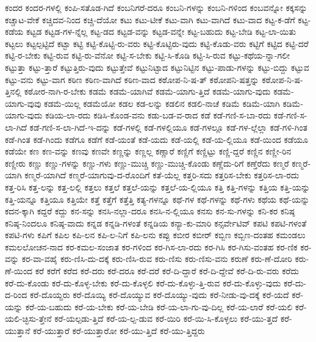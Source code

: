 {ಕಂದರ
ಕಂದರ-ಗಳಲ್ಲಿ
ಕಂಪಿ-ಸತೊಡ-ಗಿದೆ
ಕಂಬನಿಗರೆ-ದರೂ
ಕಂಬನಿ-ಗಳನ್ನು
ಕಂಬನಿ-ಗಳಿಂದ
ಕಂಬವನ್ನೋ
ಕಕ್ಕಸನ್ನು
ಕಚ್ಚಾಟ-ವೇಕೆ
ಕಚ್ಚಿದವ-ನಿಂದ
ಕಚ್ಚಿ-ದೆಯೋ
ಕಟು
ಕಟು-ಟೀಕೆ
ಕಟು-ವಾಗಿ
ಕಟು-ವಾಗಿದೆ
ಕಟು-ವಾದ
ಕಟ್ಟ-ಕ-ಡೆಗೆ
ಕಟ್ಟ-ಕಡೆಯ
ಕಟ್ಟಡ
ಕಟ್ಟಡ-ಗಳ-ನ್ನೆಲ್ಲ
ಕಟ್ಟ-ಡದ
ಕಟ್ಟಡ-ವನ್ನು
ಕಟ್ಟಡ-ವನ್ನೇ
ಕಟ್ಟ-ಬಹುದು
ಕಟ್ಟ-ಬೇಡಿ
ಕಟ್ಟ-ಲಾ-ಯಿತು
ಕಟ್ಟಲು
ಕಟ್ಟಲ್ಪಟ್ಟಿದೆ
ಕಟ್ಟಾ
ಕಟ್ಟಿ
ಕಟ್ಟಿ-ಕೊಟ್ಟಿ-ರು-ವರು
ಕಟ್ಟಿ-ಕೊಟ್ಟಿರು-ವುದು
ಕಟ್ಟಿ-ಕೊಡು-ವರು
ಕಟ್ಟಿಗೆ
ಕಟ್ಟಿದ
ಕಟ್ಟಿ-ದರೆ
ಕಟ್ಟಿ-ರ-ಬೇಕು
ಕಟ್ಟಿ-ರುವ
ಕಟ್ಟಿ-ರು-ವೆನೋ
ಕಟ್ಟಿ-ಸ-ಬೇಕು
ಕಟ್ಟಿ-ಸಿ-ಕೊಡಿ
ಕಟ್ಟಿ-ಸಿ-ರುವ
ಕಟ್ಟು-ಕಥೆಯ-ನ್ನಾ-ಗಲೀ
ಕಟ್ಟುತ್ತಾ
ಕಟ್ಟು-ತ್ತಾರೆ
ಕಟ್ಟುತ್ತಿರು-ವುದು
ಕಟ್ಟುತ್ತೇವೆ
ಕಟ್ಟುನಿಟ್ಟಾದ
ಕಟ್ಟುನಿಟ್ಟಿನ
ಕಟ್ಟು-ಪಾಡು-ಗಳನ್ನು
ಕಟ್ಟು-ಬಿದ್ದು
ಕಟ್ಟುವ
ಕಟ್ಟು-ವನು
ಕಟ್ಟು-ವಾಗ
ಕಠಿಣ
ಕಠಿಣ-ವಾಗಿದೆ
ಕಠಿಣ-ವಾದ
ಕಠೋಪ-ನಿ-ಷ-ತ್
ಕಠೋಪನಿ-ಷತ್ತನ್ನು
ಕಠೋಪ-ನಿ-ಷ-ತ್ತಿನಲ್ಲಿ
ಕಠೋರ-ನಾಗಿ-ರ-ಬೇಕು
ಕಡಮೆ
ಕಡಮೆ-ಯಾಗಿವೆ
ಕಡಮೆ-ಯಾಗು-ತ್ತಿದೆ
ಕಡಮೆ-ಯಾಗು-ವುದು
ಕಡಮೆ-ಯಾಗು-ವುವು
ಕಡಮೆ-ಯಿಲ್ಲ
ಕಡಮೆಯೋ
ಕಡಲ
ಕಡ-ಲನ್ನು
ಕಡಲಿನ
ಕಡಲಿ-ನಾಚೆ
ಕಡಿಮೆ
ಕಡಿಮೆ-ಯಾಗಿ
ಕಡಿಮೆ-ಯಾಗು-ವುದು
ಕಡಿಯ-ಲಾ-ರದು
ಕಡಿಸಿ-ಕೊಂಡ-ವನು
ಕಡು-ಬಡ-ವ-ರಾದ
ಕಡೆ
ಕಡೆ-ಗಣಿ-ಸ-ಬಾ-ರದು
ಕಡೆ-ಗಣಿ-ಸ-ಲಾ-ಗಿದೆ
ಕಡೆ-ಗಣಿ-ಸ-ಲಾ-ಗಿದೆ-ಇ-ದನ್ನು
ಕಡೆ-ಗಳಲ್ಲಿ
ಕಡೆ-ಗಳಲ್ಲಿಯೂ
ಕಡೆ-ಗಳಲ್ಲೂ
ಕಡೆ-ಗಳ-ಲ್ಲೆಲ್ಲಾ
ಕಡೆ-ಗಳಿ-ಗಿಂತ
ಕಡೆ-ಗಿಂತ
ಕಡೆ-ಗಿಂದು
ಕಡೆಗೂ
ಕಡೆಗೆ
ಕಡೆ-ಯಂತೆ
ಕಡೆ-ಯದು
ಕಡೆ-ಯಲ್ಲಿ
ಕಡೆ-ಯ-ಲ್ಲಿಯೂ
ಕಡೆ-ಯಿಂದ
ಕಡೆಯೂ
ಕಡೆಯೇ
ಕಣ
ಕಣ-ವನ್ನು
ಕಣವು
ಕಣವೇ
ಕಣ್ಣನ್ನು
ಕಣ್ಣಲ್ಲ
ಕಣ್ಣಾರೆ
ಕಣ್ಣಿಗೆ
ಕಣ್ಣಿಟ್ಟು
ಕಣ್ಣಿ-ದ್ದರೆ
ಕಣ್ಣಿನ
ಕಣ್ಣೀ-ರಿನ
ಕಣ್ಣೀರು
ಕಣ್ಣು
ಕಣ್ಣು-ಗಳನ್ನು
ಕಣ್ಣು-ಗಳು
ಕಣ್ಣು-ಮುಚ್ಚಿ
ಕಣ್ಣು-ಮುಚ್ಚಿ-ಕೊಂಡು
ಕಣ್ಣೆದು-ರಿಗೆ
ಕಣ್ತೆರೆದು
ಕಣ್ಮರೆ
ಕಣ್ಮರೆ-ಯಾಗಿ
ಕಣ್ಮರೆ-ಯಾಗಿದೆ
ಕಣ್ಮರೆ-ಯಾಗುವು-ದ-ರೊಂದಿಗೆ
ಕತೆ-ಯೆಲ್ಲ
ಕತ್ತರಿ-ಸದು
ಕತ್ತರಿಸ-ಬೇಕು
ಕತ್ತರಿಸ-ಲಾ-ರದು
ಕತ್ತ-ರಿಸಿ
ಕತ್ತ-ಲನ್ನು
ಕತ್ತ-ಲಲ್ಲಿ
ಕತ್ತಲು
ಕತ್ತಲೆ
ಕತ್ತಲೆ-ಯನ್ನು
ಕತ್ತಲೆ-ಯ-ಲ್ಲಿಯೂ
ಕತ್ತಿ
ಕತ್ತಿ-ಗಳನ್ನು
ಕತ್ತಿಯ
ಕತ್ತಿ-ಯನ್ನು
ಕತ್ತಿ-ಯನ್ನೂ
ಕತ್ತಿಯೂ
ಕತ್ತಿಯೇ
ಕತ್ತೆ
ಕತ್ತೆಗೆ
ಕತ್ತೆತ್ತಿ
ಕತ್ಯ-ಗಳನ್ನೂ
ಕಥೆ-ಗಳ
ಕಥೆ-ಗಳನ್ನು
ಕಥೆ-ಗಳು
ಕಥೆಯ
ಕಥೆ-ಯನ್ನು
ಕದನ-ಕ್ಕಾಗಿ
ಕದ್ದರೆ
ಕದ್ದು
ಕನ-ಸನ್ನು
ಕನಸಿ-ನಲ್ಲಾ-ದರೂ
ಕನಸಿ-ನ-ಲ್ಲಿಯೂ
ಕನಸು
ಕನ-ಸು-ಗಳನ್ನು
ಕನಿ-ಕರ
ಕನಿಷ್ಠ
ಕನಿಷ್ಠ-ನಿಂದಲೂ
ಕನಿಷ್ಠ-ವಾದು
ಕನ್ನಡ
ಕನ್ನಡಿ-ಗಳಂತೆ
ಕನ್ನಡಿಯ
ಕನ್ಯಾ-ಕು-ಮಾರಿ
ಕನ್ಸರ್ವೇಟಿವ್
ಕಪಟಿ
ಕಪಟಿ-ಗಳಂತೆ
ಕಪಟಿ-ಗಳು
ಕಪಿಗೆ
ಕಪಿಲ
ಕಪಿ-ಲನ
ಕಪಿ-ಲ-ನಿಗೆ
ಕಪಿ-ಲನು
ಕಪ್ಪು
ಕಬೀರ
ಕಬೀರ್
ಕಬ್ಬಿಣ
ಕಬ್ಬಿಣ-ದಂತಹ
ಕಮಂಡಲು
ಕಮಲಲೋಚನ-ನಾದ
ಕರ-ಕಮಲ-ಸಂಜಾತ
ಕರ-ಗಳಿಂದ
ಕರ-ಗಿಸ-ಲಾ-ರದು
ಕರ-ಗಿಸಿ
ಕರ-ಗಿಸು-ವಂತಹ
ಕರ-ಣಿಕ
ಕರ-ವನ್ನು
ಕರ-ವಾ-ವಹೈ
ಕರು-ಣಿಸಿ-ದು-ದಕ್ಕೆ
ಕರು-ಣಿಸಿ-ರುವ
ಕರು-ಣಿಸು
ಕರು-ಣಿಸು-ವನು
ಕರುಣೆ
ಕರು-ಣೆ-ದೋರಿ
ಕರು-ಣೆ-ಯಿಂದ
ಕರೆ
ಕರೆಗೆ
ಕರೆದ
ಕರೆ-ದರು
ಕರೆ-ದರೂ
ಕರೆ-ದರೆ
ಕರೆ-ದಿ-ದ್ದಾರೆ
ಕರೆ-ದಿ-ದ್ದೇವೆ
ಕರೆ-ದಿ-ರು-ವರು
ಕರೆದು
ಕರೆ-ದು-ಕೊಂಡು
ಕರೆ-ದು-ಕೊಳ್ಳ-ಬೇಕು
ಕರೆ-ದು-ಕೊಳ್ಳಲಿ
ಕರೆ-ದು-ಕೊಳ್ಳು-ತ್ತಿ-ರುವ
ಕರೆ-ದು-ಕೊಳ್ಳು-ವುದು
ಕರೆ-ದು-ದ-ರಿಂದ
ಕರೆ-ದೊಯ್ದರು
ಕರೆ-ದೊಯ್ಯಿ
ಕರೆ-ದೊಯ್ಯುವ
ಕರೆ-ದೊಯ್ಯು-ವುದು
ಕರೆ-ನೀಡು-ವು-ದಕ್ಕೆ
ಕರೆ-ಯದೆ
ಕರೆ-ಯನ್ನು
ಕರೆ-ಯ-ಬಹುದು
ಕರೆ-ಯ-ಬೇಕು
ಕರೆ-ಯ-ಬೇಡಿ
ಕರೆ-ಯ-ಲಾ-ಗು-ವು-ದಿಲ್ಲ
ಕರೆ-ಯ-ಲಾರೆ
ಕರೆ-ಯಲಿ
ಕರೆ-ಯಲಿ-ಚ್ಛಿಸು-ತ್ತೇನೆ
ಕರೆ-ಯಲ್ಪಡು-ತ್ತಿದೆ
ಕರೆ-ಯ-ಲ್ಪ-ಡುವ
ಕರೆ-ಯಿರಿ
ಕರೆ-ಯಿ-ಸಿ-ಕೊಳ್ಳಲು
ಕರೆ-ಯು-ತ್ತದೆ
ಕರೆ-ಯುತ್ತಾನೆ
ಕರೆ-ಯುತ್ತಾರೆ
ಕರೆ-ಯುತ್ತಾರೋ
ಕರೆ-ಯು-ತ್ತಿದೆ
ಕರೆ-ಯು-ತ್ತಿದ್ದರು
}
